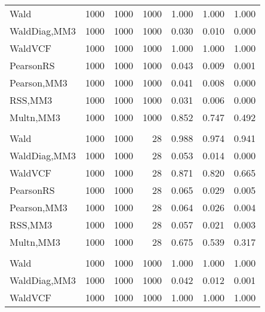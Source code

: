 \documentclass[
]{article}
\begin{document}
\begin{table}[H]
{\begin{tabular}[t]{lrrrrrr}
\hspace{1em}Wald & 1000 & 1000 & 1000 & 1.000 & 1.000 & \vphantom{1} 1.000\\
\hspace{1em}WaldDiag,MM3 & 1000 & 1000 & 1000 & 0.030 & 0.010 & 0.000\\
\hspace{1em}WaldVCF & 1000 & 1000 & 1000 & 1.000 & 1.000 & \vphantom{1} 1.000\\
\hspace{1em}PearsonRS & 1000 & 1000 & 1000 & 0.043 & 0.009 & 0.001\\
\hspace{1em}Pearson,MM3 & 1000 & 1000 & 1000 & 0.041 & 0.008 & 0.000\\
\hspace{1em}RSS,MM3 & 1000 & 1000 & 1000 & 0.031 & 0.006 & 0.000\\
\hspace{1em}Multn,MM3 & 1000 & 1000 & 1000 & 0.852 & 0.747 & 0.492\\
\addlinespace[0.3em]
\multicolumn{7}{l}{\textbf{2F 10V}}\\
\hspace{1em}Wald & 1000 & 1000 & 28 & 0.988 & 0.974 & 0.941\\
\hspace{1em}WaldDiag,MM3 & 1000 & 1000 & 28 & 0.053 & 0.014 & 0.000\\
\hspace{1em}WaldVCF & 1000 & 1000 & 28 & 0.871 & 0.820 & 0.665\\
\hspace{1em}PearsonRS & 1000 & 1000 & 28 & 0.065 & 0.029 & 0.005\\
\hspace{1em}Pearson,MM3 & 1000 & 1000 & 28 & 0.064 & 0.026 & 0.004\\
\hspace{1em}RSS,MM3 & 1000 & 1000 & 28 & 0.057 & 0.021 & 0.003\\
\hspace{1em}Multn,MM3 & 1000 & 1000 & 28 & 0.675 & 0.539 & 0.317\\
\addlinespace[0.3em]
\multicolumn{7}{l}{\textbf{3F 15V}}\\
\hspace{1em}Wald & 1000 & 1000 & 1000 & 1.000 & 1.000 & 1.000\\
\hspace{1em}WaldDiag,MM3 & 1000 & 1000 & 1000 & 0.042 & 0.012 & 0.001\\
\hspace{1em}WaldVCF & 1000 & 1000 & 1000 & 1.000 & 1.000 & 1.000\\

\end{tabular}}
\end{table}
\end{document}

